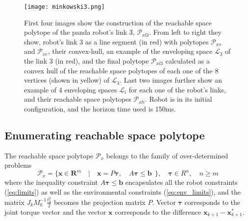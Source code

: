 
\begin{figure}[!t]
    \centering
    \texttt{[image: minkowski3.png]}
    \caption{ First four images show the construction of the reachable space polytope of the panda robot's link 3, $\mathcal{P}_{xl3}$. From left to right they show, robot's link 3 as a line segment (in red) with polytopes $\mathcal{P}_{xs}$ and $\mathcal{P}_{xe}$, their convex-hull, an example of the enveloping space $\mathcal{L}_3$ of the link 3 (in red), and the final polytope $\mathcal{P}_{xl3}$ calculated as a convex hull of the reachable space polytopes of each one of the 8 vertices (shown in yellow) of $\mathcal{L}_3$.
    Last two images further show an example of 4 enveloping spaces $\mathcal{L}_i$ for each one of the robot's links, and their reachable space polytopes $\mathcal{P}_{xli}$. Robot is in its initial configuration, and the horizon time used is 150ms.}
    \label{fig:minkowski}
\vspace{-0.3cm}
\end{figure}

\vspace{-0.2cm}
\subsection{Enumerating reachable space polytope}
\label{ch:enumerating}

The reachable space polytope $\mathcal{P}_x$ belongs to the family of over-determined problems
\begin{equation}
    \mathcal{P}_x = \{ \bm{x} \in \mathbf{R}^m \quad| \quad \bm{x}=P\bm{\tau},\quad  A\bm{\tau}\leq \bm{b} ~~\}, \quad \bm{\tau}\in R^n, \quad n\geq m
\label{eq:polytope_family}
\end{equation}
where the inequality constraint $A\bm{\tau}\leq \bm{b}$ encapsulates all the robot constraints (\ref{eq:limits}) as well as the environmental constraints (\ref{eq:env_limits}), and the matrix $J_k M_k^{-1}\frac{t_h^2}{2}$ becomes the projection matrix $P$. Vector $\bm{\tau}$ corresponds to the joint torque vector and the vector $\bm{x}$ corresponds to the difference $\bm{x}_{k+1}\!-\!\bm{x}_{k+1}^*$.

